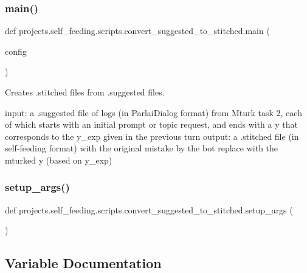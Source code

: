 \subsubsection{\texorpdfstring{main()}{main()}}
{\footnotesize\ttfamily def projects.\+self\+\_\+feeding.\+scripts.\+convert\+\_\+suggested\+\_\+to\+\_\+stitched.\+main (\begin{DoxyParamCaption}\item[{}]{config }\end{DoxyParamCaption})}

\begin{DoxyVerb}Creates .stitched files from .suggested files.

input: a .suggested file of logs (in ParlaiDialog format) from Mturk task 2, each of
    which starts with an initial prompt or topic request, and ends with a y
    that corresponds to the y_exp given in the previous turn
output: a .stitched file (in self-feeding format) with the original mistake by the
    bot replace with the mturked y (based on y_exp)
\end{DoxyVerb}
 \mbox{\label{namespaceprojects_1_1self__feeding_1_1scripts_1_1convert__suggested__to__stitched_abb3be1e61354f80ddbc5d87ffe42e518}} 
\subsubsection{\texorpdfstring{setup\+\_\+args()}{setup\_args()}}
{\footnotesize\ttfamily def projects.\+self\+\_\+feeding.\+scripts.\+convert\+\_\+suggested\+\_\+to\+\_\+stitched.\+setup\+\_\+args (\begin{DoxyParamCaption}{ }\end{DoxyParamCaption})}



\subsection{Variable Documentation}
\mbox{\label{namespaceprojects_1_1self__feeding_1_1scripts_1_1convert__suggested__to__stitched_a250073634f06e04cf67f20019ab7c905}} 
